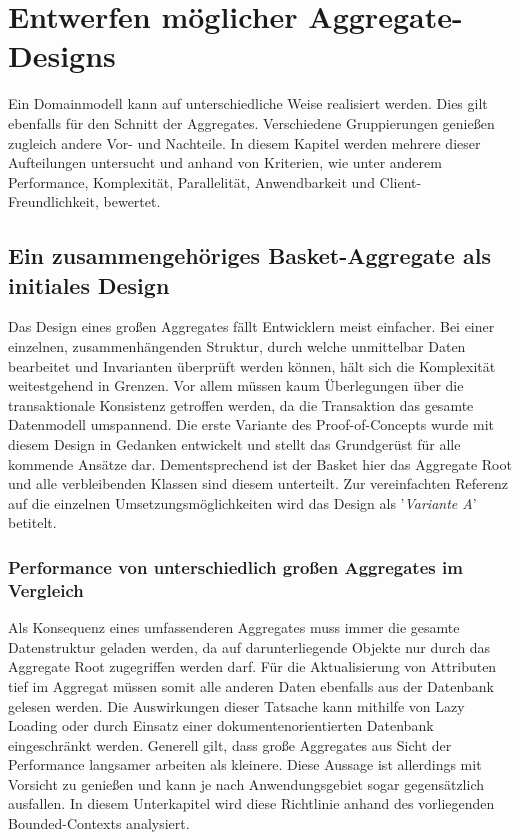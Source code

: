 \chapter{Entwerfen möglicher Aggregate-Designs}

Ein Domainmodell kann auf unterschiedliche Weise realisiert werden. Dies gilt ebenfalls für den Schnitt der Aggregates. Verschiedene Gruppierungen genießen zugleich andere Vor- und Nachteile. In diesem Kapitel werden mehrere dieser Aufteilungen untersucht und anhand von Kriterien, wie unter anderem Performance, Komplexität, Parallelität, Anwendbarkeit und Client-Freundlichkeit, bewertet.

\section{Ein zusammengehöriges Basket-Aggregate als initiales Design}

Das Design eines großen Aggregates fällt Entwicklern meist einfacher. Bei einer einzelnen, zusammenhängenden Struktur, durch welche unmittelbar Daten bearbeitet und Invarianten überprüft werden können, hält sich die Komplexität weitestgehend in Grenzen. Vor allem müssen kaum Überlegungen über die transaktionale Konsistenz getroffen werden, da die Transaktion das gesamte Datenmodell umspannend. Die erste Variante des Proof-of-Concepts wurde mit diesem Design in Gedanken entwickelt und stellt das Grundgerüst für alle kommende Ansätze dar. Dementsprechend ist der Basket hier das Aggregate Root und alle verbleibenden Klassen sind diesem unterteilt. Zur vereinfachten Referenz auf die einzelnen Umsetzungsmöglichkeiten wird das Design als '\emph{Variante A}' betitelt.


\subsection{Performance von unterschiedlich großen Aggregates im Vergleich}

Als Konsequenz eines umfassenderen Aggregates muss immer die gesamte Datenstruktur geladen werden, da auf darunterliegende Objekte nur durch das Aggregate Root zugegriffen werden darf. Für die Aktualisierung von Attributen tief im Aggregat müssen somit alle anderen Daten ebenfalls aus der Datenbank gelesen werden. Die Auswirkungen dieser Tatsache kann mithilfe von \gls{Lazy Loading} oder durch Einsatz einer dokumentenorientierten Datenbank eingeschränkt werden. Generell gilt, dass große Aggregates aus Sicht der Performance langsamer arbeiten als kleinere. Diese Aussage ist allerdings mit Vorsicht zu genießen und kann je nach Anwendungsgebiet sogar gegensätzlich ausfallen. In diesem Unterkapitel wird diese Richtlinie anhand des vorliegenden Bounded-Contexts analysiert.

